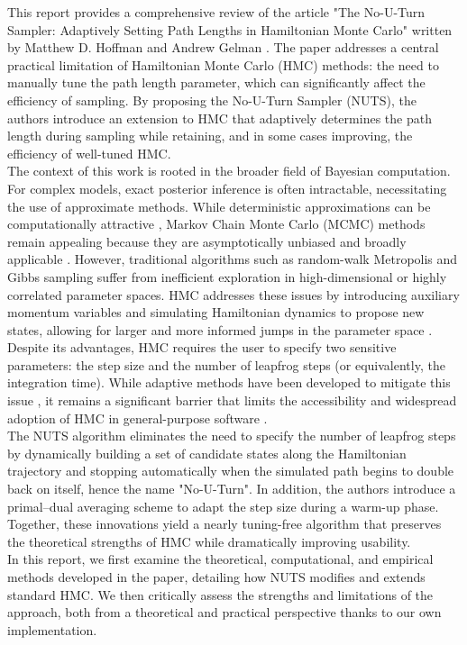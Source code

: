 \documentclass{article}
\begin{document}
This report provides a comprehensive review of the article "The No-U-Turn Sampler: Adaptively Setting Path Lengths in Hamiltonian Monte Carlo" written by Matthew D. Hoffman and Andrew Gelman \cite{main}. The paper addresses a central practical limitation of Hamiltonian Monte Carlo (HMC) methods: the need to manually tune the path length parameter, which can significantly affect the efficiency of sampling. By proposing the No-U-Turn Sampler (NUTS), the authors introduce an extension to HMC that adaptively determines the path length during sampling while retaining, and in some cases improving, the efficiency of well-tuned HMC. \\
The context of this work is rooted in the broader field of Bayesian computation. For complex models, exact posterior inference is often intractable, necessitating the use of approximate methods. While deterministic approximations can be computationally attractive \cite{wainwright2008graphical}, Markov Chain Monte Carlo (MCMC) methods remain appealing because they are asymptotically unbiased and broadly applicable \cite{neal1993probabilistic}. However, traditional algorithms such as random-walk Metropolis \cite{metropolis1953equation} and Gibbs sampling \cite{geman1984stochastic} suffer from inefficient exploration in high-dimensional or highly correlated parameter spaces. HMC addresses these issues by introducing auxiliary momentum variables and simulating Hamiltonian dynamics to propose new states, allowing for larger and more informed jumps in the parameter space \cite{neal2011mcmc}. Despite its advantages, HMC requires the user to specify two sensitive parameters: the step size and the number of leapfrog steps (or equivalently, the integration time). While adaptive methods have been developed to mitigate this issue \cite{andrieu2008tutorial, nesterov2009primal}, it remains a significant barrier that limits the accessibility and widespread adoption of HMC in general-purpose software \cite{main}.\\
The NUTS algorithm eliminates the need to specify the number of leapfrog steps by dynamically building a set of candidate states along the Hamiltonian trajectory and stopping automatically when the simulated path begins to double back on itself, hence the name "No-U-Turn". In addition, the authors introduce a primal–dual averaging scheme to adapt the step size during a warm-up phase. Together, these innovations yield a nearly tuning-free algorithm that preserves the theoretical strengths of HMC while dramatically improving usability.\\
In this report, we first examine the theoretical, computational, and empirical methods developed in the paper, detailing how NUTS modifies and extends standard HMC. We then critically assess the strengths and limitations of the approach, both from a theoretical and practical perspective thanks to our own implementation. 
\end{document}
